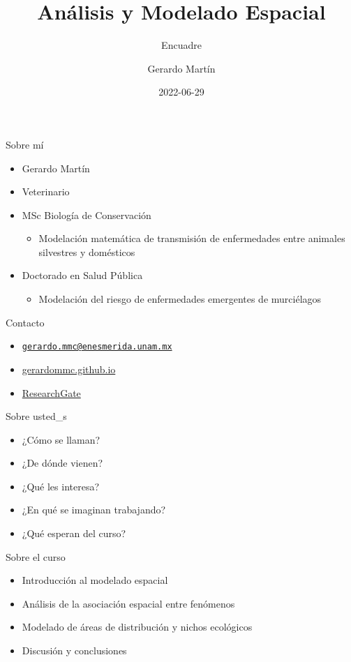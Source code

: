\documentclass[
  11pt,
  ignorenonframetext,
]{beamer}
\title{Análisis y Modelado Espacial}
\subtitle{Encuadre}
\author{Gerardo Martín}
\date{2022-06-29}
\providecommand{\tightlist}{%
  \setlength{\itemsep}{0pt}\setlength{\parskip}{0pt}}
\begin{document}
\frame{\titlepage}

\begin{frame}{Sobre mí}
\protect\hypertarget{sobre-muxed}{}
\begin{itemize}
\item
  Gerardo Martín
\item
  Veterinario
\item
  MSc Biología de Conservación

  \begin{itemize}
  \tightlist
  \item
    Modelación matemática de transmisión de enfermedades entre animales
    silvestres y domésticos
  \end{itemize}
\item
  Doctorado en Salud Pública

  \begin{itemize}
  \tightlist
  \item
    Modelación del riesgo de enfermedades emergentes de murciélagos
  \end{itemize}
\end{itemize}
\end{frame}

\begin{frame}{Contacto}
\protect\hypertarget{contacto}{}
\begin{itemize}
\tightlist
\item
  \href{mailto:gerardo.mmc@enesmerida.unam.mx}{\nolinkurl{gerardo.mmc@enesmerida.unam.mx}}
\item
  \href{https://gerardommc.github.io}{gerardommc.github.io}
\item
  \href{https://www.researchgate.net/profile/Gerardo-Martin}{ResearchGate}
\end{itemize}
\end{frame}

\begin{frame}{Sobre usted\_s}
\protect\hypertarget{sobre-usted_s}{}
\begin{itemize}
\tightlist
\item
  ¿Cómo se llaman?
\item
  ¿De dónde vienen?
\item
  ¿Qué les interesa?
\item
  ¿En qué se imaginan trabajando?
\item
  ¿Qué esperan del curso?
\end{itemize}
\end{frame}

\begin{frame}{Sobre el curso}
\protect\hypertarget{sobre-el-curso}{}
\begin{itemize}
\tightlist
\item
  Introducción al modelado espacial
\item
  Análisis de la asociación espacial entre fenómenos
\item
  Modelado de áreas de distribución y nichos ecológicos
\item
  Discusión y conclusiones
\end{itemize}
\end{frame}
\end{document}
